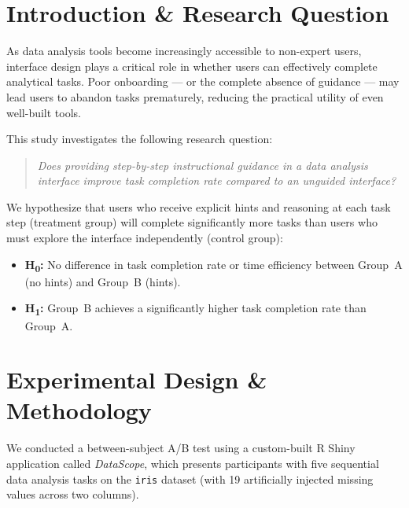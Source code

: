 \documentclass[11pt, a4paper]{article}
\begin{document}
\tableofcontents
\newpage

\section{Introduction \& Research Question}

As data analysis tools become increasingly accessible to non-expert users, interface
design plays a critical role in whether users can effectively complete analytical
tasks. Poor onboarding --- or the complete absence of guidance --- may lead users to
abandon tasks prematurely, reducing the practical utility of even well-built tools.

This study investigates the following research question:

\begin{quote}
\textit{Does providing step-by-step instructional guidance in a data analysis
interface improve task completion rate compared to an unguided interface?}
\end{quote}

We hypothesize that users who receive explicit hints and reasoning at each task step
(treatment group) will complete significantly more tasks than users who must explore
the interface independently (control group):

\begin{itemize}[leftmargin=1.5em]
  \item \textbf{H\textsubscript{0}:} No difference in task completion rate or time
        efficiency between Group~A (no hints) and Group~B (hints).
  \item \textbf{H\textsubscript{1}:} Group~B achieves a significantly higher task
        completion rate than Group~A.
\end{itemize}

\section{Experimental Design \& Methodology}

We conducted a between-subject A/B test using a custom-built R Shiny application
called \textit{DataScope}, which presents participants with five sequential data
analysis tasks on the \texttt{iris} dataset (with 19 artificially injected missing
values across two columns).
\end{document}
